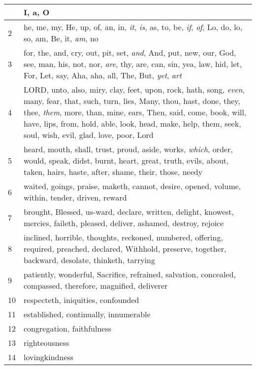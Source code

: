 \begin{longtable}{l|p{3.75in}}
\hline \hline
\endlastfoot
1 & I, a, O \\ \hline
2 & he, me, my, He, up, of, an, in, \emph{it}, \emph{is}, as, to, be, \emph{if}, \emph{of}, Lo, do, lo, so, am, Be, it, \emph{am}, no \\ \hline
3 & for, the, and, cry, out, pit, set, \emph{and}, And, put, new, our, God, see, man, his, not, nor, \emph{are}, thy, are, can, sin, yea, law, hid, let, For, Let, say, Aha, aha, all, The, But, \emph{yet}, \emph{art} \\ \hline
4 & LORD, unto, also, miry, clay, feet, upon, rock, hath, song, \emph{even}, many, fear, that, such, turn, lies, Many, thou, hast, done, they, thee, \emph{them}, more, than, mine, ears, Then, said, come, book, will, have, lips, from, hold, able, look, head, make, help, them, seek, soul, wish, evil, glad, love, poor, Lord \\ \hline
5 & heard, mouth, shall, trust, proud, aside, works, \emph{which}, order, would, speak, didst, burnt, heart, great, truth, evils, about, taken, hairs, haste, after, shame, their, those, needy \\ \hline
6 & waited, goings, praise, maketh, cannot, desire, opened, volume, within, tender, driven, reward \\ \hline
7 & brought, Blessed, us-ward, declare, written, delight, knowest, mercies, faileth, pleased, deliver, ashamed, destroy, rejoice \\ \hline
8 & inclined, horrible, thoughts, reckoned, numbered, offering, required, preached, declared, Withhold, preserve, together, backward, desolate, thinketh, tarrying \\ \hline
9 & patiently, wonderful, Sacrifice, refrained, salvation, concealed, compassed, therefore, magnified, deliverer \\ \hline
10 & respecteth, iniquities, confounded \\ \hline
11 & established, continually, innumerable \\ \hline
12 & congregation, faithfulness \\ \hline
13 & righteousness \\ \hline
14 & lovingkindness \\ \hline
\end{longtable}






